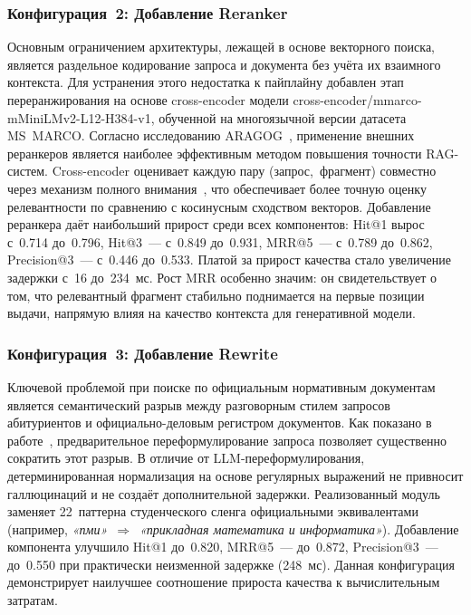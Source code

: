 \documentclass{article}
\begin{document}
\subsubsection{Конфигурация~2: Добавление Reranker}

Основным ограничением архитектуры, лежащей в основе
векторного поиска, является раздельное кодирование запроса и документа без учёта их взаимного контекста. Для устранения этого недостатка к пайплайну добавлен этап переранжирования на основе cross-encoder модели cross-en\-co\-der/mmarco-mMiniLMv2-L12-H384-v1, обученной на многоязычной версии датасета MS~MARCO. Согласно исследованию ARAGOG~\cite{5}, применение внешних реранкеров является наиболее эффективным методом повышения точности RAG-систем. Cross-encoder оценивает каждую пару (запрос,~фрагмент) совместно через механизм полного внимания~\cite{6}, что обеспечивает более точную оценку релевантности по сравнению с косинусным сходством векторов. Добавление реранкера даёт наибольший прирост среди всех компонентов: Hit@1 вырос с~0.714 до~0.796, Hit@3~--- с~0.849 до~0.931, MRR@5~--- с~0.789 до~0.862, Precision@3~--- с~0.446 до~0.533. Платой за прирост качества стало увеличение задержки с~16 до~234~мс. Рост MRR особенно значим: он свидетельствует о том, что релевантный фрагмент стабильно поднимается на первые позиции выдачи, напрямую влияя на качество контекста для генеративной модели.

\subsubsection{Конфигурация~3: Добавление Rewrite}

Ключевой проблемой при поиске по официальным нормативным документам является семантический разрыв между разговорным стилем запросов абитуриентов и официально-деловым регистром документов. Как показано в работе~\cite{2}, предварительное переформулирование запроса позволяет существенно сократить этот разрыв. В отличие от LLM-переформулирования, детерминированная нормализация на основе регулярных выражений не привносит галлюцинаций и не создаёт дополнительной задержки. Реализованный модуль заменяет 22~паттерна студенческого сленга официальными эквивалентами (например, \textit{«пми»}~$\Rightarrow$~\textit{«прикладная математика и информатика»}). Добавление компонента улучшило Hit@1 до~0.820, MRR@5~--- до~0.872, Precision@3~--- до~0.550 при практически неизменной задержке (248~мс). Данная конфигурация демонстрирует наилучшее соотношение прироста качества к вычислительным затратам.
\end{document}
